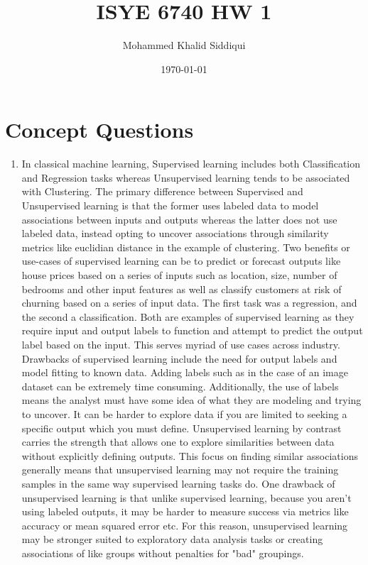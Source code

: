 \documentclass{article}
\title{ISYE 6740 HW 1}
\author{Mohammed Khalid Siddiqui}
\date{\today}
\begin{document}
\maketitle

\section{Concept Questions}

\begin{enumerate}

\item In classical machine learning, Supervised learning includes both Classification and Regression
tasks whereas Unsupervised learning tends to be associated with Clustering. The primary difference between
Supervised and Unsupervised learning is that the former uses labeled data to model associations between
inputs and outputs whereas the latter does not use labeled data, instead opting to uncover associations
through similarity metrics like euclidian distance in the example of clustering. Two benefits or use-cases
of supervised learning can be to predict or forecast outputs like house prices based on a series of inputs
such as location, size, number of bedrooms and other input features as well as classify customers at risk
of churning based on a series of input data. The first task was a regression, and the second a classification.
Both are examples of supervised learning as they require input and output labels to function and attempt
to predict the output label based on the input. This serves myriad of use cases across industry. Drawbacks of
supervised learning include the need for output labels and model fitting to known data. Adding labels
such as in the case of an image dataset can be extremely time consuming. Additionally, the use of labels means
the analyst must have some idea of what they are modeling and trying to uncover. It can be harder to explore
data if you are limited to seeking a specific output which you must define. Unsupervised learning by contrast
carries the strength that allows one to explore similarities between data without explicitly defining outputs.
This focus on finding similar associations generally means that unsupervised learning may not require the training
samples in the same way supervised learning tasks do. One drawback of unsupervised learning is that unlike
supervised learning, because you aren't using labeled outputs, it may be harder to measure success via metrics like
accuracy or mean squared error etc. For this reason, unsupervised learning may be stronger suited to
exploratory data analysis tasks or creating associations of like groups without penalties for "bad" groupings.


\end{enumerate}
\end{document}
